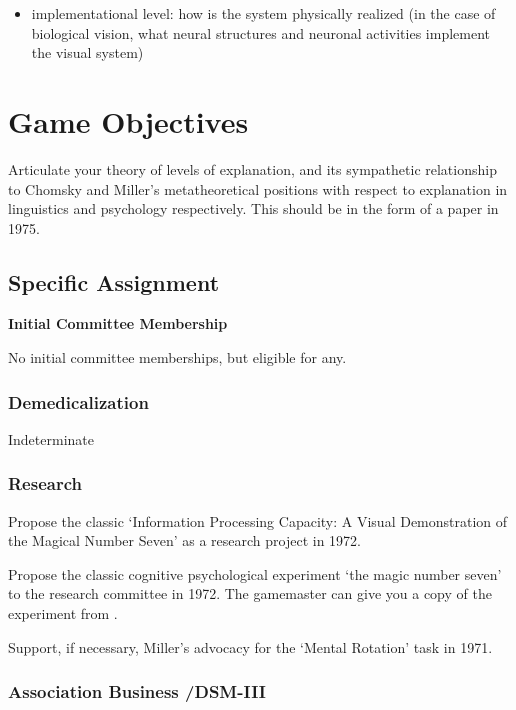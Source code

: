 \begin{refsection}
\begin{itemize}
\item implementational level: how is the system physically realized (in the case of biological vision, what neural structures and neuronal activities implement the visual system)

\end{itemize}

\section{Game Objectives}
\label{gameobjectives}

Articulate your theory of levels of explanation, and its sympathetic relationship to Chomsky and Miller's metatheoretical positions with respect to explanation in linguistics and psychology respectively. This should be in the form of a paper in 1975.

\subsection{Specific Assignment}
\label{specificassignment}

\textbf{Initial Committee Membership}

No initial committee memberships, but eligible for any.

\subsubsection{Demedicalization}
\label{demedicalization}

Indeterminate

\subsubsection{Research}
\label{research}

\begin{researchtask}[Marr]\label{researchtask:marr}

Propose the classic ‘Information Processing Capacity: A Visual Demonstration of the Magical Number Seven’ as a research project in 1972.
\end{researchtask}
Propose the classic cognitive psychological experiment ‘the magic number seven’ to the research committee in 1972. The gamemaster can give you a copy of the experiment from .

Support, if necessary, Miller’s advocacy for the ‘Mental Rotation’ task in 1971.

\subsubsection{Association Business \slash  DSM-III}
\label{associationbusinessdsm-iii}


\end{refsection}
